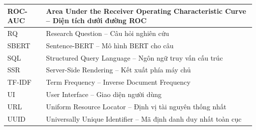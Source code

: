 \documentclass[../DoAn.tex]{subfiles}
\begin{document}
\begin{longtable}{|l|p{11cm}|}
ROC-AUC  & Area Under the Receiver Operating Characteristic Curve -- Diện tích dưới đường ROC \\ \hline
RQ       & Research Question -- Câu hỏi nghiên cứu \\ \hline
SBERT    & Sentence-BERT -- Mô hình BERT cho câu \\ \hline
SQL      & Structured Query Language -- Ngôn ngữ truy vấn cấu trúc \\ \hline
SSR      & Server-Side Rendering -- Kết xuất phía máy chủ \\ \hline
TF-IDF   & Term Frequency -- Inverse Document Frequency \\ \hline
UI       & User Interface -- Giao diện người dùng \\ \hline
URL      & Uniform Resource Locator -- Định vị tài nguyên thống nhất \\ \hline
UUID     & Universally Unique Identifier -- Mã định danh duy nhất toàn cục \\ \hline
\end{longtable}
\end{document}
